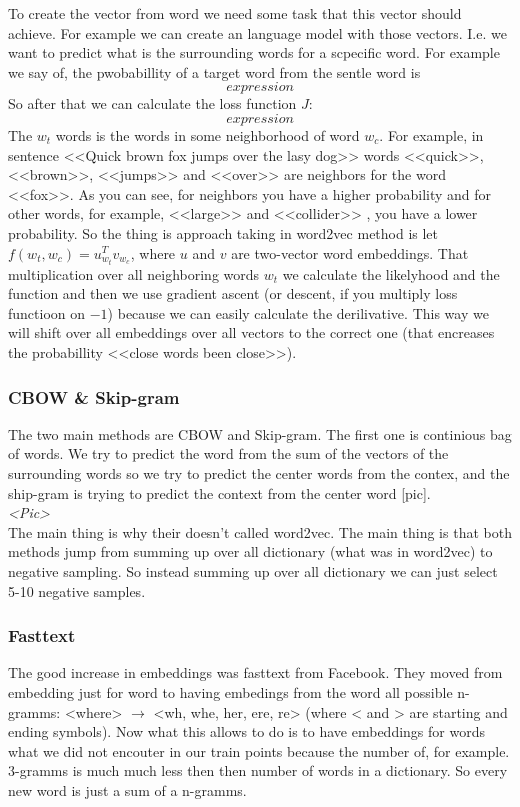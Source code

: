 To create the vector from word we need some task that this vector should achieve. For example we can create an language model with those vectors. I.e. we want to predict what is the surrounding words for a scpecific word. For example we say of, the pwobabillity of a target word from the sentle word is
$$expression$$
So after that we can calculate the loss function $J$:
$$expression$$
The $w_t$ words is the words in some neighborhood of word $w_c$. For example, in sentence <<Quick brown fox jumps over the lasy dog>> words <<quick>>, <<brown>>, <<jumps>> and <<over>> are neighbors for the word <<fox>>. As you can see, for neighbors you have a higher probability and for other words, for example, <<large>> and <<collider>> , you have a lower probability. So the thing is approach taking in word2vec method is let $f(w_t,w_c)=u_{w_t}^Tv_{w_c}$, where $u$ and $v$ are two-vector word embeddings. That multiplication over all neighboring words $w_t$  we calculate the likelyhood and the function and then we use gradient ascent (or descent, if you multiply loss functioon on $-1$) because we can easily calculate the derilivative. This way we will shift over all embeddings over all vectors to the correct one (that encreases the probabillity <<close words been close>>).

\subsubsection*{CBOW \& Skip-gram}

The two main methods are CBOW and Skip-gram. The first one is continious bag of words. We try to predict the word from the sum of the vectors of the surrounding words so we try to predict the center words from the contex, and the ship-gram is trying to predict the context from the center word [pic].\\
{\it <Pic>}\\
The main thing is why their doesn't called word2vec. The main thing is that both methods jump from summing up over all dictionary (what was in word2vec) to negative sampling. So instead summing up over all dictionary we can just select 5-10 negative samples.

\subsubsection*{Fasttext}

The good increase in embeddings was fasttext from Facebook. They moved from embedding just for word to having embedings from the word all possible n-gramms: <where> $\to$ <wh, whe, her, ere, re> (where < and > are starting and ending symbols). Now what this allows to do is to have embeddings for words what we did not encouter in our train points because the number of, for example. 3-gramms is much much less then then number of words in a dictionary. So every new word is just a sum of a n-gramms.

